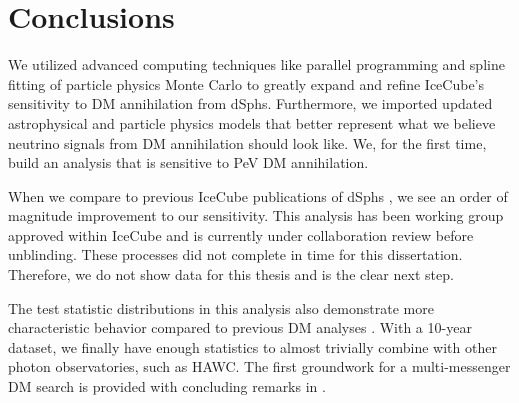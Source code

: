 \section{Conclusions} \label{sec:icDM_conclude}

We utilized advanced computing techniques like parallel programming and spline fitting of particle physics Monte Carlo to greatly expand and refine IceCube's sensitivity to DM annihilation from dSphs.
Furthermore, we imported updated astrophysical and particle physics models that better represent what we believe neutrino signals from DM annihilation should look like.
We, for the first time, build an analysis that is sensitive to PeV DM annihilation.

When we compare to previous IceCube publications of dSphs \cite{IC3_DM2013}, we see an order of magnitude improvement to our sensitivity.
This analysis has been working group approved within IceCube and is currently under collaboration review before unblinding.
These processes did not complete in time for this dissertation.
Therefore, we do not show data for this thesis and is the clear next step.

The test statistic distributions in this analysis also demonstrate more characteristic behavior compared to previous DM analyses \cite{Minjin_icrc23,IC3_nulines}.
With a 10-year dataset, we finally have enough statistics to almost trivially combine with other photon observatories, such as HAWC.
The first groundwork for a multi-messenger DM search is provided with concluding remarks in .